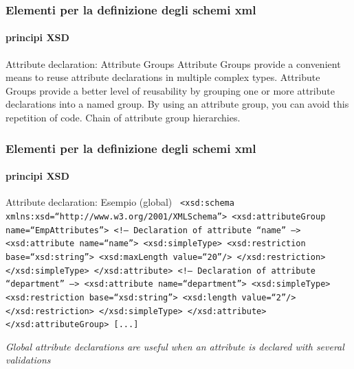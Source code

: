 

\begin{frame}
	\frametitle{Elementi per la definizione degli schemi xml}
	\framesubtitle{principi XSD}
	\addtocounter{nframe}{1}

	\begin{block}{Attribute declaration: Attribute Groups}
		Attribute Groups provide a convenient means to reuse attribute declarations in multiple complex types. Attribute Groups provide a better level of reusability by grouping one or more attribute declarations into a named group. By using an attribute group, you can avoid this repetition of code. Chain of attribute group hierarchies.
	\end{block}



\end{frame}



\begin{frame}
	\frametitle{Elementi per la definizione degli schemi xml}
	\framesubtitle{principi XSD}
	\addtocounter{nframe}{1}

	\begin{block}{Attribute declaration: Esempio (global)}
		\texttt{
			<xsd:schema xmlns:xsd=``http://www.w3.org/2001/XMLSchema''>
			<xsd:attributeGroup name=``EmpAttributes''>
			<!-- Declaration of attribute ``name'' -->
			<xsd:attribute name=``name''>
			<xsd:simpleType>
			<xsd:restriction base=``xsd:string''>
			<xsd:maxLength value=``20''/>
			</xsd:restriction>
			</xsd:simpleType>
			</xsd:attribute>
			<!-- Declaration of attribute ``department'' -->
			<xsd:attribute name=``department''>
			<xsd:simpleType>
			<xsd:restriction base=``xsd:string''>
			<xsd:length value=``2''/>
			</xsd:restriction>
			</xsd:simpleType>
			</xsd:attribute>
			</xsd:attributeGroup>
			[...]
		}
	\end{block}

	\textit{Global attribute declarations are useful when an attribute is declared with several validations}


\end{frame}


